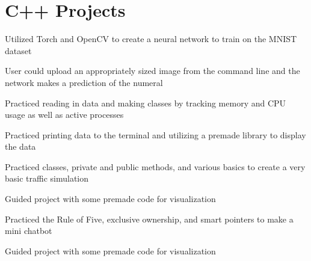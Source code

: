 \documentclass[letterpaper]{resume}
\begin{document}
\section{C++ Projects}

\begin{compactitem}
\item Utilized Torch and OpenCV to create a neural network to train on the MNIST dataset
\item User could upload an appropriately sized image from the command line and the network makes a prediction of the numeral
\end{compactitem}

\begin{compactitem}
\item Practiced reading in data and making classes by tracking memory and CPU usage as well as active processes
\item Practiced printing data to the terminal and utilizing a premade library to display the data
\end{compactitem}

\begin{compactitem}
\item Practiced classes, private and public methods, and various basics to create a very basic traffic simulation
\item Guided project with some premade code for visualization
\end{compactitem}

\begin{compactitem}
\item Practiced the Rule of Five, exclusive ownership, and smart pointers to make a mini chatbot
\item Guided project with some premade code for visualization
\end{compactitem}
\end{document}
